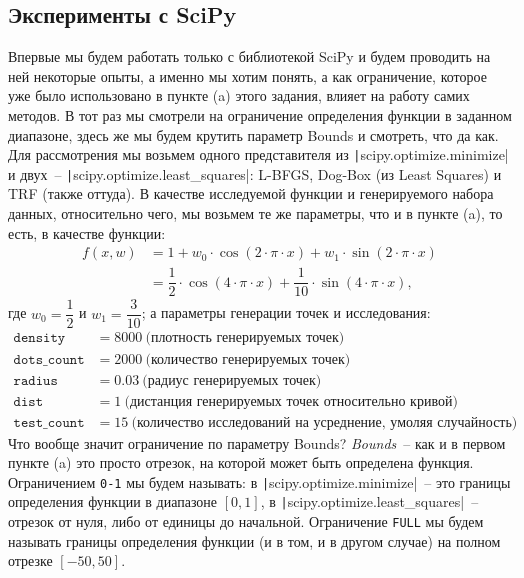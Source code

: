 \documentclass[12pt, a4paper, oneside, final]{article}
\begin{document}
	\subsection*{Эксперименты с SciPy}
	Впервые мы будем работать только с библиотекой SciPy и будем проводить на ней некоторые опыты, а именно мы хотим понять, а как ограничение, которое уже было использовано в пункте (a) этого задания, влияет на работу самих методов.
	В тот раз мы смотрели на ограничение определения функции в заданном диапазоне, здесь же мы будем крутить параметр Bounds и смотреть, что да как.
	Для рассмотрения мы возьмем одного представителя из \texttt|scipy.optimize.minimize| и двух~-- \texttt|scipy.optimize.least\_squares|: L-BFGS, Dog-Box (из Least Squares) и TRF (также оттуда).
	В качестве исследуемой функции и генерируемого набора данных, относительно чего, мы возьмем те же параметры, что и в пункте (a), то есть, в качестве функции:
	\begin{align*}
		f(x, w) &= 1 + w_0 \cdot \cos{(2 \cdot \pi \cdot x)} + w_1 \cdot \sin{(2 \cdot \pi \cdot x)} \\
		&= \dfrac{1}{2} \cdot \cos{(4 \cdot \pi \cdot x)} + \dfrac{1}{10} \cdot \sin{(4 \cdot \pi \cdot x)},
	\end{align*} где $w_0 = \dfrac{1}{2}$ и $w_1 = \dfrac{3}{10}$; а параметры генерации точек и исследования:
	\begin{align*}
		\mathtt{density} &= 8000~\text{(плотность генерируемых точек)} \\
		\mathtt{dots\_count} &= 2000~\text{(количество генерируемых точек)} \\
		\mathtt{radius} &= 0.03~\text{(радиус генерируемых точек)} \\
		\mathtt{dist} &= 1~\text{(дистанция генерируемых точек относительно кривой)} \\
		\mathtt{test\_count} &= 15~\text{(количество исследований на усреднение, умоляя случайность)}
	\end{align*}
	Что вообще значит ограничение по параметру Bounds?
	\textit{Bounds}~-- как и в первом пункте (a) это просто отрезок, на которой может быть определена функция. Ограничением \texttt{0-1} мы будем называть: в \texttt|scipy.optimize.minimize|~-- это границы определения функции в диапазоне $[0, 1]$, в \texttt|scipy.optimize.least\_squares|~-- отрезок от нуля, либо от единицы до начальной. Ограничение \texttt{FULL} мы будем называть границы определения функции (и в том, и в другом случае) на полном отрезке $[-50, 50]$.
\end{document}
